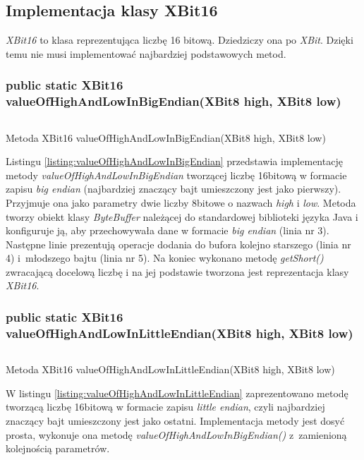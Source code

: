 \subsection{Implementacja klasy XBit16}
\emph{XBit16} to klasa reprezentująca liczbę 16 bitową. Dziedziczy ona po \emph{XBit}. Dzięki temu nie musi implementować najbardziej podstawowych metod. 


\subsubsection{public static XBit16 valueOfHighAndLowInBigEndian(XBit8 high, XBit8 low)}
\begin{listing}[h]
	\inputminted{java}{listings/xbit/valueOfHighAndLowInBigEndian.java}
	\caption{Metoda XBit16 valueOfHighAndLowInBigEndian(XBit8 high, XBit8 low)}
	\label{listing:valueOfHighAndLowInBigEndian}
\end{listing}
Listingu \ref{listing:valueOfHighAndLowInBigEndian} przedstawia implementację metody \emph{valueOfHighAndLowInBigEndian} tworzącej liczbę 16{\dywiz}bitową w formacie zapisu \emph{big endian} (najbardziej znaczący bajt umieszczony jest jako pierwszy). Przyjmuje ona jako parametry dwie liczby 8{\dywiz}bitowe o nazwach \emph{high} i \emph{low}. 
Metoda tworzy obiekt klasy \emph{ByteBuffer} należącej do standardowej biblioteki języka Java i konfiguruje ją, aby przechowywała dane w formacie \emph{big endian} (linia nr 3). 
Następne linie prezentują operacje dodania do bufora kolejno starszego (linia nr 4) i~młodszego  bajtu (linia nr 5). Na koniec wykonano metodę \emph{getShort()} zwracającą docelową liczbę i na jej podstawie tworzona jest reprezentacja klasy \emph{XBit16}.

\subsubsection{public static XBit16 valueOfHighAndLowInLittleEndian(XBit8 high, XBit8 low)}
\begin{listing}[h]
	\inputminted{java}{listings/xbit/valueOfHighAndLowInLittleEndian.java}
	\caption{Metoda XBit16 valueOfHighAndLowInLittleEndian(XBit8 high, XBit8 low)}
	\label{listing:valueOfHighAndLowInLittleEndian}
\end{listing}
W listingu \ref{listing:valueOfHighAndLowInLittleEndian} zaprezentowano metodę tworzącą liczbę 16{\dywiz}bitową w formacie zapisu \emph{little endian}, czyli najbardziej znaczący bajt umieszczony jest jako ostatni.
Implementacja metody jest dosyć prosta, wykonuje ona metodę \emph{valueOfHighAndLowInBigEndian()} z~zamienioną kolejnością parametrów.


